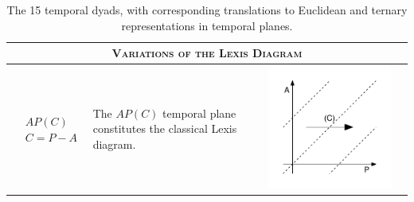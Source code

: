 \documentclass[11pt,oneside,a4paper]{article} %
\begin{document}
\begin{center}
  \small
  \begin{longtable}{m{}m{}m{}m{}}
  \caption{The 15 temporal dyads, with corresponding translations to Euclidean
  and ternary representations in temporal planes.\protect\footnotemark} 
  \label{tab:dyads} \\
  \multicolumn{4}{c}{\textsc{Variations of the Lexis Diagram}} \\
  \midrule
  $$\begin{aligned}
    &AP(C) \\
    &C = P - A
  \end{aligned}$$ &
  The $AP(C)$ temporal plane constitutes the classical Lexis diagram. &
  \includegraphics[width = \linewidth]{Figures/JonasTable/APc.pdf} &

\end{longtable}
\end{center}
\end{document}
